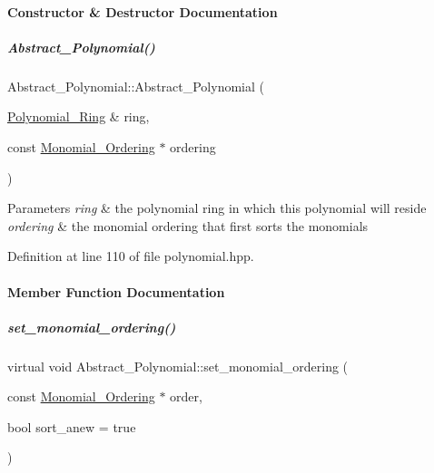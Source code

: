\paragraph{Constructor \& Destructor Documentation}
\mbox{\label{group__polygroup_af72cda5555005f99c9844fece4e5ca46}} 
\subparagraph{\texorpdfstring{Abstract\+\_\+\+Polynomial()}{Abstract\_Polynomial()}}
{\footnotesize\ttfamily Abstract\+\_\+\+Polynomial\+::\+Abstract\+\_\+\+Polynomial (\begin{DoxyParamCaption}\item[{\hyperlink{group__polygroup_class_polynomial___ring}{Polynomial\+\_\+\+Ring} \&}]{ring,  }\item[{const \hyperlink{group__orderinggroup_class_monomial___ordering}{Monomial\+\_\+\+Ordering} $\ast$}]{ordering }\end{DoxyParamCaption})\hspace{0.3cm}{\ttfamily [inline]}}


\begin{DoxyParams}{Parameters}
{\em ring} & the polynomial ring in which this polynomial will reside \\
\hline
{\em ordering} & the monomial ordering that first sorts the monomials \\
\hline
\end{DoxyParams}


Definition at line 110 of file polynomial.\+hpp.



\paragraph{Member Function Documentation}
\mbox{\label{group__polygroup_a12e023570eb675343c4b7ed635a031dc}} 
\subparagraph{\texorpdfstring{set\+\_\+monomial\+\_\+ordering()}{set\_monomial\_ordering()}}
{\footnotesize\ttfamily virtual void Abstract\+\_\+\+Polynomial\+::set\+\_\+monomial\+\_\+ordering (\begin{DoxyParamCaption}\item[{const \hyperlink{group__orderinggroup_class_monomial___ordering}{Monomial\+\_\+\+Ordering} $\ast$}]{order,  }\item[{bool}]{sort\+\_\+anew = {\ttfamily true} }\end{DoxyParamCaption})\hspace{0.3cm}{\ttfamily [pure virtual]}}



